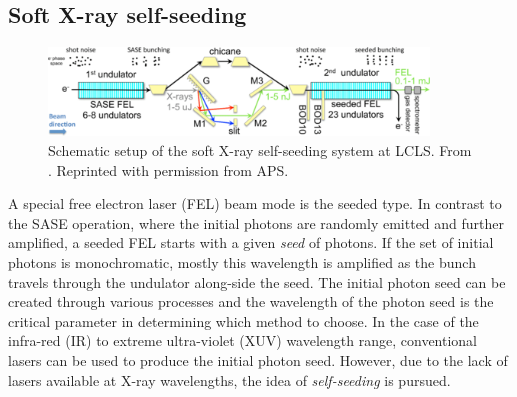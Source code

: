 \subsection{Soft X-ray self-seeding}
%
\begin{figure}
	\centering
		\includegraphics[width=0.90\textwidth]{images/seeded.png}
	\caption[Schematic setup of soft X-ray self-seeding system.]{Schematic setup of the soft X-ray self-seeding system at LCLS. From \citep{Ratner-2015-PRL}. Reprinted with permission from APS.}
	\label{fig:seeded-setup}
\end{figure}
%
A special free electron laser (FEL) beam mode is the seeded type. In contrast to the SASE operation, where the initial photons are randomly emitted and further amplified, a seeded FEL starts with a given \textit{seed} of photons. If the set of initial photons is monochromatic, mostly this wavelength is amplified as the bunch travels through the undulator along-side the seed. The initial photon seed can be created through various processes and the wavelength of the photon seed is the critical parameter in determining which method to choose. In the case of the infra-red (IR) to extreme ultra-violet (XUV) wavelength range, conventional lasers can be used to produce the initial photon seed. However, due to the lack of lasers available at X-ray wavelengths, the idea of \textit{self-seeding} is pursued.\\[1\baselineskip]
%
